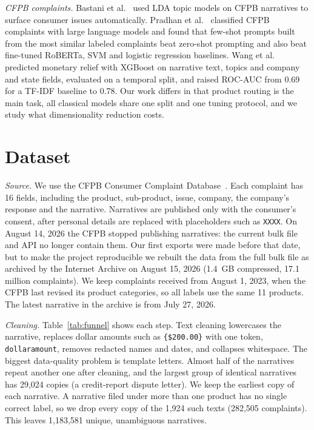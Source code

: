 \documentclass[conference]{IEEEtran}
\begin{document}
\textit{CFPB complaints.} Bastani et al.~\cite{bastani} used LDA topic models on CFPB narratives to surface consumer issues automatically. Pradhan et al.~\cite{pradhan} classified CFPB complaints with large language models and found that few-shot prompts built from the most similar labeled complaints beat zero-shot prompting and also beat fine-tuned RoBERTa, SVM and logistic regression baselines. Wang et al.~\cite{wang} predicted monetary relief with XGBoost on narrative text, topics and company and state fields, evaluated on a temporal split, and raised ROC-AUC from 0.69 for a TF-IDF baseline to 0.78. Our work differs in that product routing is the main task, all classical models share one split and one tuning protocol, and we study what dimensionality reduction costs.

\section{Dataset}
\label{sec:data}
\textit{Source.} We use the CFPB Consumer Complaint Database~\cite{cfpb}. Each complaint has 16 fields, including the product, sub-product, issue, company, the company's response and the narrative. Narratives are published only with the consumer's consent, after personal details are replaced with placeholders such as \texttt{XXXX}. On August 14, 2026 the CFPB stopped publishing narratives: the current bulk file and API no longer contain them. Our first exports were made before that date, but to make the project reproducible we rebuilt the data from the full bulk file as archived by the Internet Archive on August 15, 2026 (1.4~GB compressed, 17.1 million complaints). We keep complaints received from August 1, 2023, when the CFPB last revised its product categories, so all labels use the same 11 products. The latest narrative in the archive is from July 27, 2026.

\textit{Cleaning.} Table~\ref{tab:funnel} shows each step. Text cleaning lowercases the narrative, replaces dollar amounts such as \texttt{\{\$200.00\}} with one token, \texttt{dollaramount}, removes redacted names and dates, and collapses whitespace. The biggest data-quality problem is template letters. Almost half of the narratives repeat another one after cleaning, and the largest group of identical narratives has 29,024 copies (a credit-report dispute letter). We keep the earliest copy of each narrative. A narrative filed under more than one product has no single correct label, so we drop every copy of the 1,924 such texts (282,505 complaints). This leaves 1,183,581 unique, unambiguous narratives.
\end{document}
